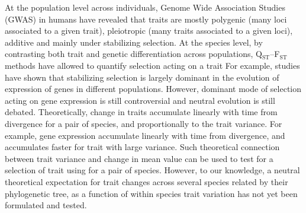 \documentclass{article}
\begin{document}
At the population level across individuals, Genome Wide Association Studies (GWAS) in humans have revealed that traits are mostly polygenic (many loci associated to a given trait), pleiotropic (many traits associated to a given loci), additive and mainly under stabilizing selection\cite{simons_population_2018, sella_thinking_2019}.
At the species level, by contrasting both trait and genetic differentiation across populations, Q$_\text{ST}$--F$_\text{ST}$ methods have allowed to quantify selection acting on a trait\cite{martin_multivariate_2008, leinonen_qst_2013}
For example, studies have shown that stabilizing selection is largely dominant in the evolution of expression of genes in different populations\cite{whitehead_neutral_2006, gilad_natural_2006}.
However, dominant mode of selection acting on gene expression is still controversial and neutral evolution is still debated\cite{signor_evolution_2018, price_detecting_2022}.
Theoretically, change in traits accumulate linearly with time from divergence for a pair of species, and proportionally to the trait variance\cite{lande_genetic_1980, turelli_heritable_1984}.
For example, gene expression accumulate linearly with time from divergence, and accumulates faster for trait with large variance\cite{khaitovich_neutral_2004}.
Such theoretical connection between trait variance and change in mean value can be used to test for a selection of trait using for a pair of species\cite{walsh_evolution_2018}.
However, to our knowledge, a neutral theoretical expectation for trait changes across several species related by their phylogenetic tree, as a function of within species trait variation has not yet been formulated and tested.
\end{document}
